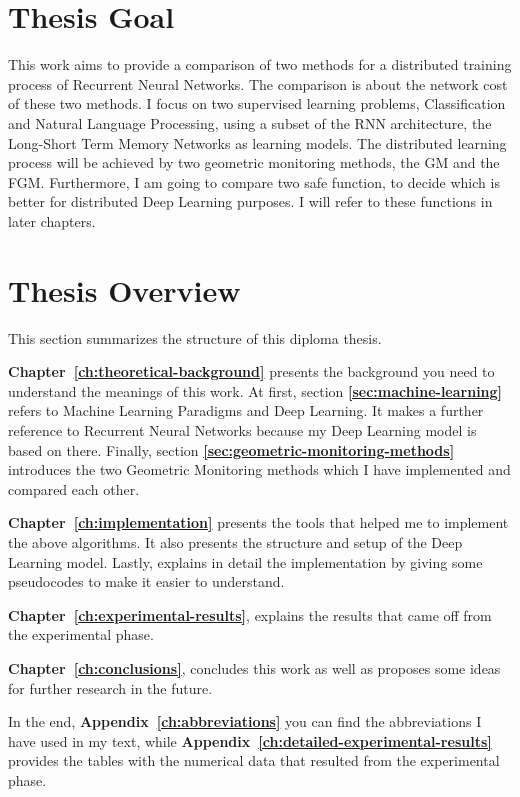 \section{Thesis Goal}\label{sec:our goal}

This work aims to provide a comparison of two methods for a distributed training process of Recurrent Neural Networks.
The comparison is about the network cost of these two methods.
I focus on two supervised learning problems, Classification and Natural Language Processing, using a subset of the RNN architecture, the Long-Short Term Memory Networks as learning models.
The distributed learning process will be achieved by two geometric monitoring methods, the GM and the FGM\@.
Furthermore, I am going to compare two safe function, to decide which is better for distributed Deep Learning purposes.
I will refer to these functions in later chapters.


\section{Thesis Overview}\label{sec:thesis-overview}

This section summarizes the structure of this diploma thesis.

\textbf{Chapter~\ref{ch:theoretical-background}} presents the background you need to understand the meanings of this work.
At first, section \textbf{\ref{sec:machine-learning}} refers to Machine Learning Paradigms and Deep Learning.
It makes a further reference to Recurrent Neural Networks because my Deep Learning model is based on there.
Finally, section \textbf{\ref{sec:geometric-monitoring-methods}} introduces the two Geometric Monitoring methods which I have implemented and compared each other.

\textbf{Chapter~\ref{ch:implementation}} presents the tools that helped me to implement the above algorithms.
It also presents the structure and setup of the Deep Learning model.
Lastly, explains in detail the implementation by giving some pseudocodes to make it easier to understand.

\textbf{Chapter~\ref{ch:experimental-results}}, explains the results that came off from the experimental phase.

\textbf{Chapter~\ref{ch:conclusions}}, concludes this work as well as proposes some ideas for further research in the future.

In the end, \textbf{Appendix~\ref{ch:abbreviations}} you can find the abbreviations I have used in my text,
while \textbf{Appendix~\ref{ch:detailed-experimental-results}} provides the tables with the numerical data that resulted from the experimental phase.